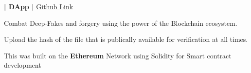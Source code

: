 \documentclass[]{deedy-resume-openfont}
\begin{document}
\begin{minipage}[t]{0.66\textwidth}
\textbf{| DApp | }\href{https://github.com/anugrahsinghal/DecentralizedStorage-DApp}{Github Link}\\
\begin{tightemize}
\item Combat Deep-Fakes and forgery using the power of the Blockchain ecosystem.
\item Upload the hash of the file that is publically available for verification at all times.
\item This was built on the \textbf{Ethereum} Network using Solidity for Smart contract development %
\end{tightemize}
\sectionsep




\end{minipage}
\end{document}
